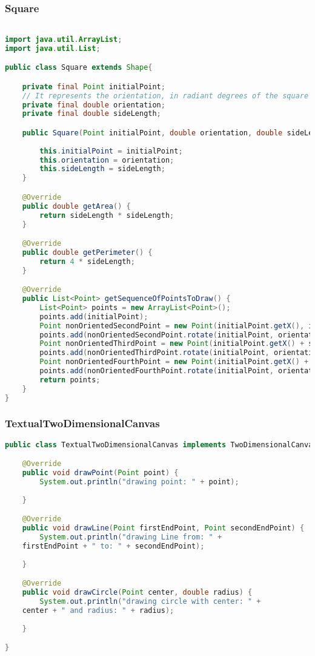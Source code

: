 \documentclass{article}
\begin{document}
\subsubsection{Square}
\begin{lstlisting}[language=Java,escapechar=|]

import java.util.ArrayList;
import java.util.List;

public class Square extends Shape{

	private final Point initialPoint;
	// It represents the orientation, in radiant degrees of the square
	private final double orientation;
	private final double sideLength;

	public Square(Point initialPoint, double orientation, double sideLength) {
	
		this.initialPoint = initialPoint;
		this.orientation = orientation;
		this.sideLength = sideLength;
	}

	@Override
	public double getArea() {
		return sideLength * sideLength;
	}

	@Override
	public double getPerimeter() {
		return 4 * sideLength;
	}

	@Override
	public List<Point> getSequenceOfPointsToDraw() {
		List<Point> points = new ArrayList<Point>();
		points.add(initialPoint);
		Point nonOrientedSecondPoint = new Point(initialPoint.getX(), initialPoint.getY() + sideLength);
		points.add(nonOrientedSecondPoint.rotate(initialPoint, orientation));
		Point nonOrientedThirdPoint = new Point(initialPoint.getX() + sideLength, initialPoint.getY() + sideLength);
		points.add(nonOrientedThirdPoint.rotate(initialPoint, orientation));
		Point nonOrientedFourthPoint = new Point(initialPoint.getX() + sideLength, initialPoint.getY());
		points.add(nonOrientedFourthPoint.rotate(initialPoint, orientation));
		return points;
	}
}
\end{lstlisting}

\subsubsection{TextualTwoDimensionalCanvas}
\begin{lstlisting}[language=Java,escapechar=|]
public class TextualTwoDimensionalCanvas implements TwoDimensionalCanvas{

	@Override
	public void drawPoint(Point point) {
		System.out.println("drawing point: " + point);
		
	}

	@Override
	public void drawLine(Point firstEndPoint, Point secondEndPoint) {
		System.out.println("drawing Line from: " + 
	firstEndPoint + " to: " + secondEndPoint);
		
	}

	@Override
	public void drawCircle(Point center, double radius) {
		System.out.println("drawing circle with center: " + 
	center + " and radius: " + radius);
		
	}

}
\end{lstlisting}
\end{document}
